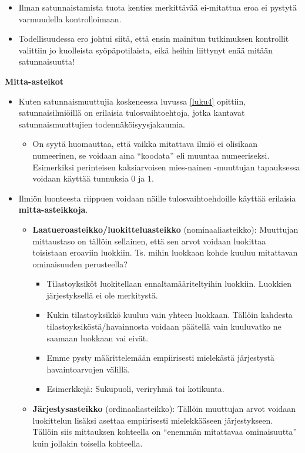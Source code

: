 \documentclass[
]{book}
\providecommand{\tightlist}{%
  \setlength{\itemsep}{0pt}\setlength{\parskip}{0pt}}
\begin{document}
\begin{eblock}{}
\begin{itemize}
  \begin{itemize}
  \tightlist
  \item
    Ilman satunnaistamista tuota kenties merkittävää ei-mitattua eroa ei pystytä varmuudella kontrolloimaan.
  \item
    Todellisuudessa ero johtui siitä, että ensin mainitun tutkimuksen kontrollit valittiin jo kuolleista syöpäpotilaista, eikä heihin liittynyt enää mitään satunnaisuutta!
  \end{itemize}
\end{itemize}

\end{eblock}

\hfill\break

\textbf{Mitta-asteikot}

\begin{itemize}
\item
  Kuten satunnaismuuttujia koskeneessa luvussa \ref{luku4} opittiin, satunnaisilmiöillä on erilaisia tulosvaihtoehtoja, jotka kantavat satunnaismuuttujien todennäköisyysjakaumia.

  \begin{itemize}
  \tightlist
  \item
    On syytä huomauttaa, että vaikka mitattava ilmiö ei olisikaan numeerinen, se voidaan aina ``koodata'' eli muuntaa numeeriseksi. Esimerkiksi perinteisen kaksiarvoisen mies-nainen -muuttujan tapauksessa voidaan käyttää tunnuksia 0 ja 1.
  \end{itemize}
\item
  Ilmiön luonteesta riippuen voidaan näille tulosvaihtoehdoille käyttää erilaisia \textbf{mitta-asteikkoja}.

  \begin{itemize}
  \tightlist
  \item
    \textbf{Laatueroasteikko/luokitteluasteikko} (nominaaliasteikko): Muuttujan mittaustaso on tällöin sellainen, että sen arvot voidaan luokittaa toisistaan eroaviin luokkiin. Ts. mihin luokkaan kohde kuuluu mitattavan ominaisuuden perusteella?

    \begin{itemize}
    \tightlist
    \item
      Tilastoyksiköt luokitellaan ennaltamääriteltyihin luokkiin. Luokkien järjestyksellä ei ole merkitystä.
    \item
      Kukin tilastoyksikkö kuuluu vain yhteen luokkaan. Tällöin kahdesta tilastoyksiköstä/havainnosta voidaan päätellä vain kuuluvatko ne saamaan luokkaan vai eivät.
    \item
      Emme pysty määrittelemään empiirisesti mielekästä järjestystä havaintoarvojen välillä.
    \item
      Esimerkkejä: Sukupuoli, veriryhmä tai kotikunta.
    \end{itemize}
  \item
    \textbf{Järjestysasteikko} (ordinaaliasteikko): Tällöin muuttujan arvot voidaan luokittelun lisäksi asettaa empiirisesti mielekkääseen järjestykseen. Tällöin siis mittauksen kohteella on ``enemmän mitattavaa ominaisuutta'' kuin jollakin toisella kohteella.


\end{itemize}
\end{itemize}
\end{document}

